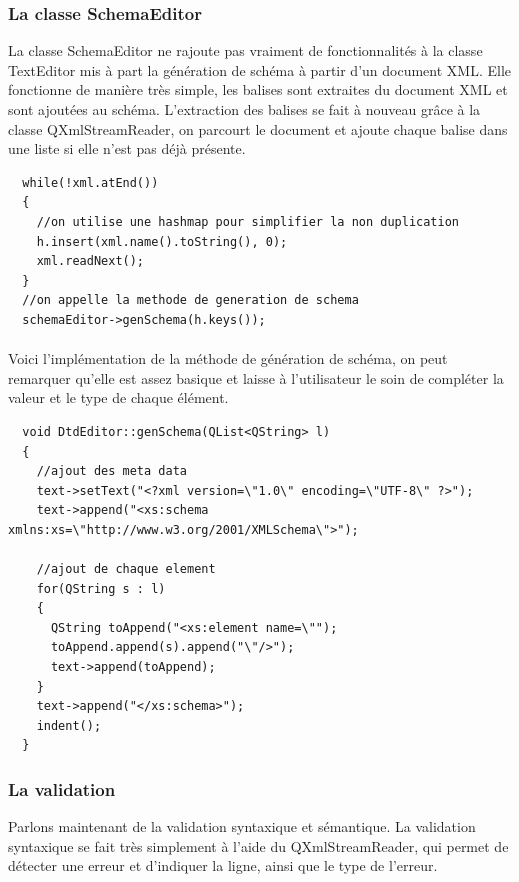 \paragraph{}
\subsubsection{La classe SchemaEditor}
La classe SchemaEditor ne rajoute pas vraiment de fonctionnalités à la classe TextEditor mis à part la génération de schéma à partir d'un document XML. Elle fonctionne de manière très simple, les balises sont extraites du document XML et sont ajoutées au schéma. L'extraction des balises se fait à nouveau grâce à la classe QXmlStreamReader, on parcourt le document et ajoute chaque balise dans une liste si elle n'est pas déjà présente.

\begin{lstlisting}
  while(!xml.atEnd())
  {
    //on utilise une hashmap pour simplifier la non duplication
    h.insert(xml.name().toString(), 0);
    xml.readNext();
  }
  //on appelle la methode de generation de schema
  schemaEditor->genSchema(h.keys());
\end{lstlisting}
\paragraph{}
Voici l'implémentation de la méthode de génération de schéma, on peut remarquer qu'elle est assez basique et laisse à l'utilisateur le soin de compléter la valeur et le type de chaque élément.
\begin{lstlisting}
  void DtdEditor::genSchema(QList<QString> l)
  {
    //ajout des meta data
    text->setText("<?xml version=\"1.0\" encoding=\"UTF-8\" ?>");
    text->append("<xs:schema xmlns:xs=\"http://www.w3.org/2001/XMLSchema\">");

    //ajout de chaque element
    for(QString s : l)
    {
      QString toAppend("<xs:element name=\"");
      toAppend.append(s).append("\"/>");
      text->append(toAppend);
    }
    text->append("</xs:schema>");
    indent();
  }

\end{lstlisting}
\paragraph{}
\subsubsection{La validation}
Parlons maintenant de la validation syntaxique et sémantique. La validation syntaxique se fait très simplement à l'aide du QXmlStreamReader, qui permet de détecter une erreur et d'indiquer la ligne, ainsi que le type de l'erreur.

